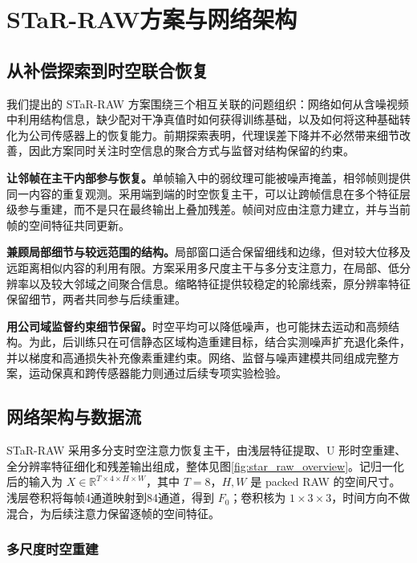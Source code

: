 \documentclass[11pt,a4paper,UTF8,fontset=fandol]{ctexart}
\begin{document}
\section{STaR-RAW方案与网络架构}
\label{sec:star_method}

\subsection{从补偿探索到时空联合恢复}

我们提出的 STaR-RAW 方案围绕三个相互关联的问题组织：网络如何从含噪视频中利用结构信息，缺少配对干净真值时如何获得训练基础，以及如何将这种基础转化为公司传感器上的恢复能力。前期探索表明，代理误差下降并不必然带来细节改善，因此方案同时关注时空信息的聚合方式与监督对结构保留的约束。

\textbf{让邻帧在主干内部参与恢复。}单帧输入中的弱纹理可能被噪声掩盖，相邻帧则提供同一内容的重复观测。采用端到端的时空恢复主干，可以让跨帧信息在多个特征层级参与重建，而不是只在最终输出上叠加残差。帧间对应由注意力建立，并与当前帧的空间特征共同更新。

\textbf{兼顾局部细节与较远范围的结构。}局部窗口适合保留细线和边缘，但对较大位移及远距离相似内容的利用有限。方案采用多尺度主干与多分支注意力，在局部、低分辨率以及较大邻域之间聚合信息。缩略特征提供较稳定的轮廓线索，原分辨率特征保留细节，两者共同参与后续重建。

\textbf{用公司域监督约束细节保留。}时空平均可以降低噪声，也可能抹去运动和高频结构。为此，后训练只在可信静态区域构造重建目标，结合实测噪声扩充退化条件，并以梯度和高通损失补充像素重建约束。网络、监督与噪声建模共同组成完整方案，运动保真和跨传感器能力则通过后续专项实验检验。

\subsection{网络架构与数据流}
\label{sec:network_flow}

STaR-RAW 采用多分支时空注意力恢复主干，由浅层特征提取、U 形时空重建、全分辨率特征细化和残差输出组成，整体见图\ref{fig:star_raw_overview}。记归一化后的输入为 $X\in\mathbb R^{T\times4\times H\times W}$，其中 $T=8$，$H,W$ 是 packed RAW 的空间尺寸。浅层卷积将每帧4通道映射到84通道，得到 $F_0$；卷积核为 $1\times3\times3$，时间方向不做混合，为后续注意力保留逐帧的空间特征。

\subsubsection{多尺度时空重建}
\end{document}
